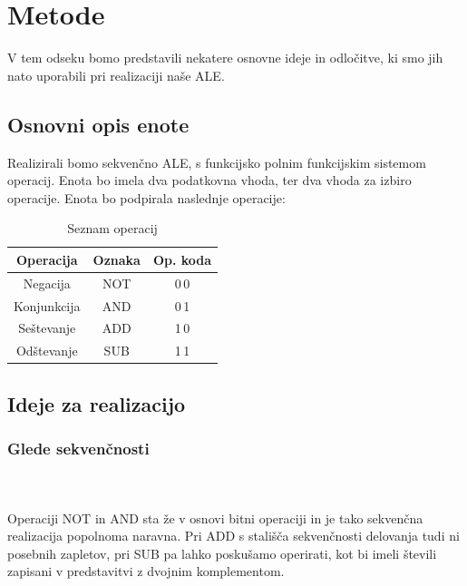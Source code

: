 \documentclass[seminar, slovene]{FRIreport}
\begin{document}
\section{Metode}
V tem odseku bomo predstavili nekatere osnovne ideje in odločitve, ki smo jih nato uporabili pri realizaciji naše ALE.

\subsection{Osnovni opis enote}
Realizirali bomo sekvenčno ALE, s funkcijsko polnim funkcijskim sistemom operacij. Enota bo imela dva podatkovna vhoda, ter dva vhoda za izbiro operacije. Enota bo podpirala naslednje operacije:\\
\begin{table}[H]
\begin{center}
\begin{tabular}{ | c | c | c | }\hline
\textbf{Operacija} & \textbf{Oznaka} & \textbf{Op. koda} \\ \hline
Negacija & NOT & 0\,0 \\
Konjunkcija & AND & 0\,1 \\
Seštevanje & ADD & 1\,0 \\
Odštevanje & SUB & 1\,1 \\ \hline
\end{tabular}
\caption{Seznam operacij}
\label{optable}
\end{center}
\end{table}
\subsection{Ideje za realizacijo}
\subsubsection{Glede sekvenčnosti}\ \\ \ \\
Operaciji NOT in AND sta že v osnovi bitni operaciji in je tako sekvenčna realizacija popolnoma naravna. Pri ADD s stališča sekvenčnosti delovanja tudi ni posebnih zapletov, pri SUB pa lahko poskušamo operirati, kot bi imeli števili zapisani v predstavitvi z dvojnim komplementom.
\end{document}

